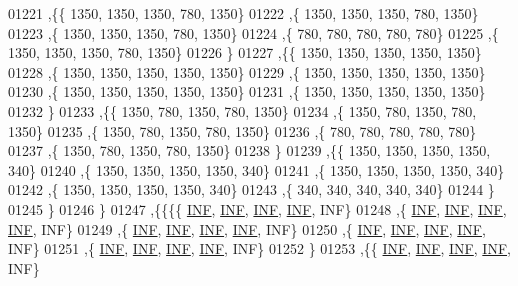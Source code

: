 \begin{DoxyCode}
01221   ,\{\{  1350,  1350,  1350,   780,  1350\}
01222    ,\{  1350,  1350,  1350,   780,  1350\}
01223    ,\{  1350,  1350,  1350,   780,  1350\}
01224    ,\{   780,   780,   780,   780,   780\}
01225    ,\{  1350,  1350,  1350,   780,  1350\}
01226    \}
01227   ,\{\{  1350,  1350,  1350,  1350,  1350\}
01228    ,\{  1350,  1350,  1350,  1350,  1350\}
01229    ,\{  1350,  1350,  1350,  1350,  1350\}
01230    ,\{  1350,  1350,  1350,  1350,  1350\}
01231    ,\{  1350,  1350,  1350,  1350,  1350\}
01232    \}
01233   ,\{\{  1350,   780,  1350,   780,  1350\}
01234    ,\{  1350,   780,  1350,   780,  1350\}
01235    ,\{  1350,   780,  1350,   780,  1350\}
01236    ,\{   780,   780,   780,   780,   780\}
01237    ,\{  1350,   780,  1350,   780,  1350\}
01238    \}
01239   ,\{\{  1350,  1350,  1350,  1350,   340\}
01240    ,\{  1350,  1350,  1350,  1350,   340\}
01241    ,\{  1350,  1350,  1350,  1350,   340\}
01242    ,\{  1350,  1350,  1350,  1350,   340\}
01243    ,\{   340,   340,   340,   340,   340\}
01244    \}
01245   \}
01246  \}
01247 ,\{\{\{\{   \hyperlink{constants_8h_a12c2040f25d8e3a7b9e1c2024c618cb6}{INF},   \hyperlink{constants_8h_a12c2040f25d8e3a7b9e1c2024c618cb6}{INF},   \hyperlink{constants_8h_a12c2040f25d8e3a7b9e1c2024c618cb6}{INF},   \hyperlink{constants_8h_a12c2040f25d8e3a7b9e1c2024c618cb6}{INF},   INF\}
01248    ,\{   \hyperlink{constants_8h_a12c2040f25d8e3a7b9e1c2024c618cb6}{INF},   \hyperlink{constants_8h_a12c2040f25d8e3a7b9e1c2024c618cb6}{INF},   \hyperlink{constants_8h_a12c2040f25d8e3a7b9e1c2024c618cb6}{INF},   \hyperlink{constants_8h_a12c2040f25d8e3a7b9e1c2024c618cb6}{INF},   INF\}
01249    ,\{   \hyperlink{constants_8h_a12c2040f25d8e3a7b9e1c2024c618cb6}{INF},   \hyperlink{constants_8h_a12c2040f25d8e3a7b9e1c2024c618cb6}{INF},   \hyperlink{constants_8h_a12c2040f25d8e3a7b9e1c2024c618cb6}{INF},   \hyperlink{constants_8h_a12c2040f25d8e3a7b9e1c2024c618cb6}{INF},   INF\}
01250    ,\{   \hyperlink{constants_8h_a12c2040f25d8e3a7b9e1c2024c618cb6}{INF},   \hyperlink{constants_8h_a12c2040f25d8e3a7b9e1c2024c618cb6}{INF},   \hyperlink{constants_8h_a12c2040f25d8e3a7b9e1c2024c618cb6}{INF},   \hyperlink{constants_8h_a12c2040f25d8e3a7b9e1c2024c618cb6}{INF},   INF\}
01251    ,\{   \hyperlink{constants_8h_a12c2040f25d8e3a7b9e1c2024c618cb6}{INF},   \hyperlink{constants_8h_a12c2040f25d8e3a7b9e1c2024c618cb6}{INF},   \hyperlink{constants_8h_a12c2040f25d8e3a7b9e1c2024c618cb6}{INF},   \hyperlink{constants_8h_a12c2040f25d8e3a7b9e1c2024c618cb6}{INF},   INF\}
01252    \}
01253   ,\{\{   \hyperlink{constants_8h_a12c2040f25d8e3a7b9e1c2024c618cb6}{INF},   \hyperlink{constants_8h_a12c2040f25d8e3a7b9e1c2024c618cb6}{INF},   \hyperlink{constants_8h_a12c2040f25d8e3a7b9e1c2024c618cb6}{INF},   \hyperlink{constants_8h_a12c2040f25d8e3a7b9e1c2024c618cb6}{INF},   INF\}

\end{DoxyCode}

